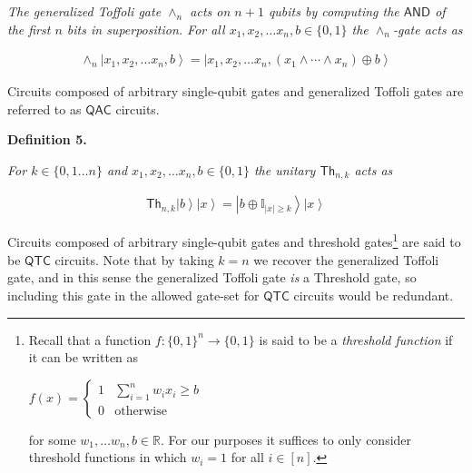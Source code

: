 \emph{The generalized Toffoli gate $\land_{n}$ acts on $n+1$ qubits by computing the $\mathsf{AND}$ of the first $n$ bits in superposition. For all $x_{1},x_{2},\dots x_{n},b\in\{0,1\}$ the $\wedge_{n}$-gate acts as}\par


\[\begin{gathered}
\displaystyle\land_{n}\left|x_{1},x_{2},\dots x_{n},b\right\rangle=\left|x_{1},x_{2},\dots x_{n},(x_{1}\land\cdots\land x_{n})\oplus b\right\rangle
\end{gathered}\]






Circuits composed of arbitrary single-qubit gates and generalized Toffoli gates are referred to as ${\mathsf{QAC}}$ circuits.\par





\par\medskip\noindent\textbf{
\textbf{Definition 5}\textbf{.}
}\par



\emph{For $k\in\{0,1\dots n\}$ and $x_{1},x_{2},\dots x_{n},b\in\{0,1\}$ the unitary $\mathsf{Th}_{n,k}$ acts as}\par


\[\begin{gathered}
\displaystyle\mathsf{Th}_{n,k}\left|b\right\rangle\left|x\right\rangle=\left|b\oplus\mathbb{I}_{|x|\geq k}\right\rangle\left|x\right\rangle
\end{gathered}\]






Circuits composed of arbitrary single-qubit gates and threshold gates\footnote{Recall that a function $f\colon\{0,1\}^{n}\to\{0,1\}$ is said to be a \emph{threshold function} if it can be written as





$\displaystyle f(x)=\begin{cases}1&\sum_{i=1}^{n}w_{i}x_{i}\geq b\\
0&\text{otherwise}\end{cases}$


for some $w_{1},\dots w_{n},b\in\mathbb{R}$. For our purposes it suffices to only consider threshold functions in which $w_{i}=1$ for all $i\in[n]$.} are said to be ${\mathsf{QTC}}$ circuits. Note that by taking $k=n$ we recover the generalized Toffoli gate, and in this sense the generalized Toffoli gate \emph{is} a Threshold gate, so including this gate in the allowed gate-set for ${\mathsf{QTC}}$ circuits would be redundant.\par




